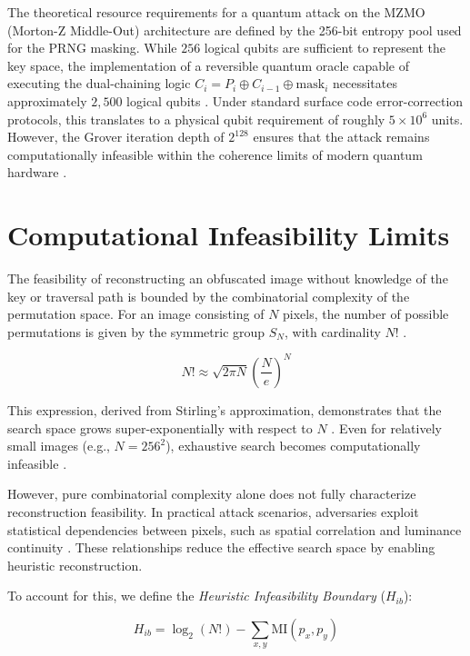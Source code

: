 \documentclass[12pt,fleqn]{article}
\begin{document}
The theoretical resource requirements for a quantum attack on the MZMO (Morton-Z Middle-Out) architecture are defined by the 256-bit entropy pool used for the PRNG masking. While $256$ logical qubits are sufficient to represent the key space, the implementation of a reversible quantum oracle capable of executing the dual-chaining logic $C_i = P_i \oplus C_{i-1} \oplus \text{mask}_i$ necessitates approximately $2,500$ logical qubits \cite{fowler2012surface}. Under standard surface code error-correction protocols, this translates to a physical qubit requirement of roughly $5 \times 10^6$ units. However, the Grover iteration depth of $2^{128}$ ensures that the attack remains computationally infeasible within the coherence limits of modern quantum hardware \cite{gidney2021factor}.

\section{Computational Infeasibility Limits}

The feasibility of reconstructing an obfuscated image without knowledge of the key or traversal path is bounded by the combinatorial complexity of the permutation space. For an image consisting of $N$ pixels, the number of possible permutations is given by the symmetric group $S_N$, with cardinality $N!$ \cite{biggs2003discrete}.

\begin{equation}
N! \approx \sqrt{2\pi N} \left(\frac{N}{e}\right)^N
\end{equation}

This expression, derived from Stirling's approximation, demonstrates that the search space grows super-exponentially with respect to $N$ \cite{robbins1955remark}. Even for relatively small images (e.g., $N = 256^2$), exhaustive search becomes computationally infeasible \cite{shannon1949communication}.

However, pure combinatorial complexity alone does not fully characterize reconstruction feasibility. In practical attack scenarios, adversaries exploit statistical dependencies between pixels, such as spatial correlation and luminance continuity \cite{wang2004image}. These relationships reduce the effective search space by enabling heuristic reconstruction.

To account for this, we define the \textit{Heuristic Infeasibility Boundary} ($H_{ib}$):

\begin{equation}
H_{ib} = \log_2(N!) - \sum_{x,y} \text{MI}(p_x, p_y)
\end{equation}
\end{document}
